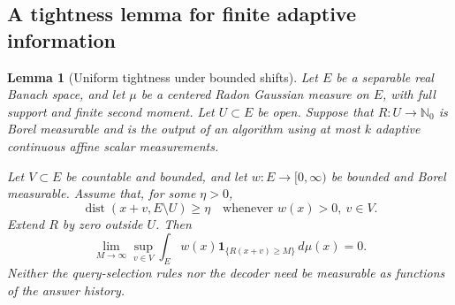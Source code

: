 \documentclass[11pt,a4paper]{article}
\newcommand{\N}{\mathbb N}
\newtheorem{lemma}[theorem]{Lemma}
\theoremstyle{definition}
\theoremstyle{remark}
\numberwithin{equation}{section}
\begin{document}
\subsection{A tightness lemma for finite adaptive information}

\begin{lemma}[Uniform tightness under bounded shifts]
\label{lem:tightness}
Let \(E\) be a separable real Banach space, and let \(\mu\) be a centered
Radon Gaussian measure on \(E\), with full support and finite second
moment. Let \(U\subset E\) be open. Suppose that
\(R:U\to\N_0\) is Borel measurable and is the output of an algorithm using
at most \(k\) adaptive continuous affine scalar measurements.

Let \(V\subset E\) be countable and bounded, and let
\(w:E\to[0,\infty)\) be bounded and Borel measurable. Assume that, for
some \(\eta>0\),
\[
 \operatorname{dist}(x+v,E\setminus U)\ge\eta
 \quad\text{whenever }w(x)>0,\ v\in V.
 \tag{T1}
\]
Extend \(R\) by zero outside \(U\). Then
\[
 \lim_{M\to\infty}\sup_{v\in V}
       \int_E w(x)\mathbf1_{\{R(x+v)\ge M\}}\,d\mu(x)=0.
 \tag{T2}
\]
Neither the query-selection rules nor the decoder need be measurable as
functions of the answer history.
\end{lemma}
\end{document}
